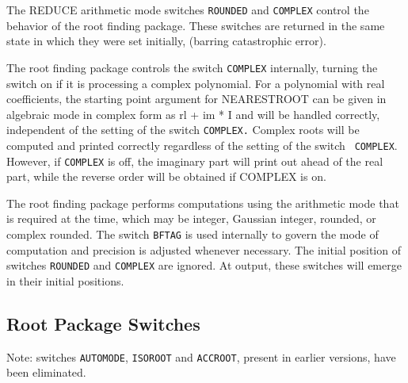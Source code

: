 The REDUCE arithmetic mode switches {\tt ROUNDED} and {\tt COMPLEX}
control the behavior of the root finding package.
These switches are returned in the same state in which they were set
initially, (barring catastrophic error).

\begin{description}
\item[COMPLEX] The root finding package controls the switch {\tt COMPLEX}
internally, turning the switch on if it is processing a complex
polynomial.
For a polynomial with real coefficients, the
starting point argument for NEARESTROOT can be given in algebraic mode in
complex form as rl + im * I and will be handled correctly, independent of
the setting of the switch {\tt COMPLEX.} Complex roots will be computed
and printed correctly regardless of the setting of the switch {\tt
COMPLEX}.  However, if {\tt COMPLEX} is off, the imaginary part will print
out ahead of the real part, while the reverse order will be obtained if
COMPLEX is on.

\item[ROUNDED] The
root finding package performs computations using the arithmetic mode that
is required at the time, which may be integer, Gaussian integer, rounded,
or complex rounded.  The switch {\tt BFTAG} is used internally to govern
the mode of computation and precision is adjusted whenever necessary.  The
initial position of switches {\tt ROUNDED} and {\tt COMPLEX} are ignored.
At output, these switches will emerge in their initial positions.
\end{description}

\subsection{Root Package Switches}

Note: switches {\tt AUTOMODE}, {\tt ISOROOT} and {\tt ACCROOT}, present in
earlier versions, have been eliminated.

